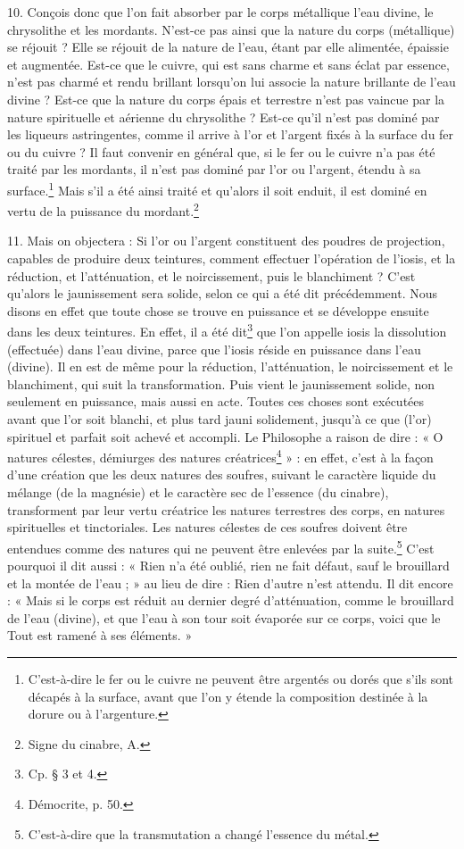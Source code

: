 \documentclass[a4paper, 11pt, oneside, polutonikogreek, french]{article}
\begin{document}
10. Conçois donc que l'on fait absorber par le corps métallique l'eau divine, le chrysolithe et les mordants. N'est-ce pas ainsi que la nature du corps (métallique) se réjouit ? Elle se réjouit de la nature de l'eau, étant par elle alimentée, épaissie et augmentée. Est-ce que le cuivre, qui est sans charme et sans éclat par essence, n'est pas charmé et rendu brillant lorsqu'on lui associe la nature brillante de l'eau divine ? Est-ce que la nature du corps épais et terrestre n'est pas vaincue par la nature spirituelle et aérienne du chrysolithe ? Est-ce qu'il n'est pas dominé par les liqueurs astringentes, comme il arrive à l'or et l'argent fixés à la surface du fer ou du cuivre ? Il faut convenir en général que, si le fer ou le cuivre n'a pas été traité par les mordants, il n'est pas dominé par l'or ou l'argent, étendu à sa surface.\footnote{C'est-à-dire le fer ou le cuivre ne peuvent être argentés ou dorés que s'ils sont décapés à la surface, avant que l'on y étende la composition destinée à la dorure ou à l'argenture.} Mais s'il a été ainsi traité et qu'alors il soit enduit, il est dominé en vertu de la puissance du mordant.\footnote{Signe du cinabre, A.}

11. Mais on objectera : Si l'or ou l'argent constituent des poudres de projection, capables de produire deux teintures, comment effectuer l'opération de l'iosis, et la réduction, et l'atténuation, et le noircissement, puis le blanchiment ? C'est qu'alors le jaunissement sera solide, selon ce qui a été dit précédemment. Nous disons en effet que toute chose se trouve en puissance et se développe ensuite dans les deux teintures. En effet, il a été dit\footnote{Cp. § 3 et 4.} que l'on appelle iosis la dissolution (effectuée) dans l'eau divine, parce que l'iosis réside en puissance dans l'eau (divine). Il en est de même pour la réduction, l'atténuation, le noircissement et le blanchiment, qui suit la transformation. Puis vient le jaunissement solide, non seulement en puissance, mais aussi en acte. Toutes ces choses sont exécutées avant que l'or soit blanchi, et plus tard jauni solidement, jusqu'à ce que (l'or) spirituel et parfait soit achevé et accompli. Le Philosophe a raison de dire : « O natures célestes, démiurges des natures créatrices\footnote{Démocrite, p. 50.} » : en effet, c'est à la façon d'une création que les deux natures des soufres, suivant le caractère liquide du mélange (de la magnésie) et le caractère sec de l'essence (du cinabre), transforment par leur vertu créatrice les natures terrestres des corps, en natures spirituelles et tinctoriales. Les natures célestes de ces soufres doivent être entendues comme des natures qui ne peuvent être enlevées par la suite.\footnote{C'est-à-dire que la transmutation a changé l'essence du métal.} C'est pourquoi il dit aussi : « Rien n'a été oublié, rien ne fait défaut, sauf le brouillard et la montée de l'eau ; » au lieu de dire : Rien d'autre n'est attendu. Il dit encore : « Mais si le corps est réduit au dernier degré d'atténuation, comme le brouillard de l'eau (divine), et que l'eau à son tour soit évaporée sur ce corps, voici que le Tout est ramené à ses éléments. »
\end{document}

